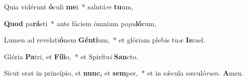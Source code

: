 \item Quia vidérunt \textbf{ó}culi \textbf{me}i~* salutá\textit{re} \textbf{tu}um,
\item \textbf{Quod} pa\textbf{rá}sti~* ante fáciem ómnium po\textit{pu}\textbf{ló}rum,
\item Lumen ad revelati\textbf{ó}nem \textbf{Gén}\textbf{ti}um,~* et glóriam plebis tu\textit{æ} \textbf{Is}rael.
\item Glória \textbf{Pa}tri, et \textbf{Fí}\textbf{li}o,~* et Spirítu\textit{i} \textbf{San}cto.
\item Sicut erat in princípio, et \textbf{nunc,} et \textbf{sem}per,~* et in sǽcula sæculó\textit{rum.} \textbf{A}men.

